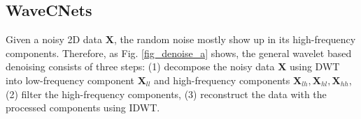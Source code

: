 \documentclass[10pt,twocolumn,letterpaper]{article}
\begin{document}
\subsection{WaveCNets}
Given a noisy 2D data $\textbf{X}$, the random noise mostly show up in its high-frequency components.
Therefore, as Fig. \ref{fig_denoise_a} shows, the general wavelet based denoising \cite{donoho1995noising,donoho1994ideal}
consists of three steps:
(1) decompose the noisy data $\textbf{X}$ using DWT into low-frequency component $\textbf{X}_{ll}$
and high-frequency components $\textbf{X}_{lh}, \textbf{X}_{hl}, \textbf{X}_{hh}$,
(2) filter the high-frequency components,
(3) reconstruct the data with the processed components using IDWT.
\begin{figure}[bpt]
	\centering
\end{figure}
\end{document}
